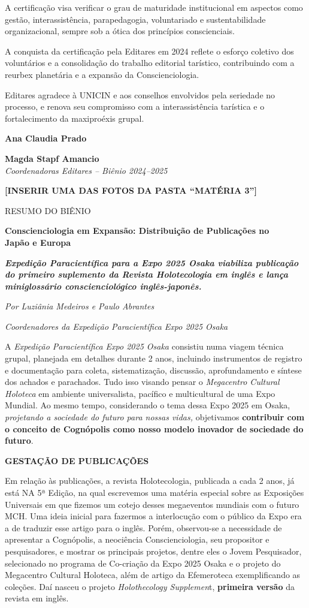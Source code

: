 A certificação visa verificar o grau de maturidade institucional em aspectos como gestão, interassistência, parapedagogia, voluntariado e sustentabilidade organizacional, sempre sob a ótica dos princípios conscienciais.

A conquista da certificação pela Editares em 2024 reflete o esforço coletivo dos voluntários e a consolidação do trabalho editorial tarístico, contribuindo com a reurbex planetária e a expansão da Conscienciologia.

Editares agradece à UNICIN e aos conselhos envolvidos pela seriedade no processo, e renova seu compromisso com a interassistência tarística e o fortalecimento da maxiproéxis grupal.

\textbf{Ana Claudia Prado}

\textbf{Magda Stapf Amancio\\
}\emph{Coordenadoras Editares -- Biênio 2024--2025}

\textbf{{[}INSERIR UMA DAS FOTOS DA PASTA ``MATÉRIA 3''{]}}

RESUMO DO BIÊNIO

\textbf{Conscienciologia em Expansão: Distribuição de Publicações no\\
Japão e Europa}

\emph{\textbf{Expedição Paracientífica para a Expo 2025 Osaka viabiliza publicação do primeiro suplemento da Revista Holotecologia em inglês e lança miniglossário conscienciológico inglês-japonês.}}

\emph{Por Luziânia Medeiros e Paulo Abrantes}

\emph{Coordenadores da Expedição Paracientífica Expo 2025 Osaka}

A \emph{Expedição Paracientífica Expo 2025 Osaka} consistiu numa viagem técnica grupal, planejada em detalhes durante 2 anos, incluindo instrumentos de registro e documentação para coleta, sistematização, discussão, aprofundamento e síntese dos achados e parachados. Tudo isso visando pensar o \emph{Megacentro Cultural Holoteca} em ambiente universalista, pacífico e multicultural de uma Expo Mundial. Ao mesmo tempo, considerando o tema dessa Expo 2025 em Osaka, \emph{projetando a sociedade do futuro para nossas vidas,} objetivamos \textbf{contribuir com o conceito de Cognópolis como nosso modelo inovador de sociedade do futuro}.

\textbf{GESTAÇÃO DE PUBLICAÇÕES}

Em relação às publicações, a revista Holotecologia, publicada a cada 2 anos, já está NA 5ª Edição, na qual escrevemos uma matéria especial sobre as Exposições Universais em que fizemos um cotejo desses megaeventos mundiais com o futuro MCH. Uma ideia inicial para fazermos a interlocução com o público da Expo era a de traduzir esse artigo para o inglês. Porém, observou-se a necessidade de apresentar a Cognópolis, a neociência Conscienciologia, seu propositor e pesquisadores, e mostrar os principais projetos, dentre eles o Jovem Pesquisador, selecionado no programa de Co-criação da Expo 2025 Osaka e o projeto do Megacentro Cultural Holoteca, além de artigo da Efemeroteca exemplificando as coleções. Daí nasceu o projeto \emph{Holothecology Supplemen}t, \textbf{primeira versão} da revista em inglês.

